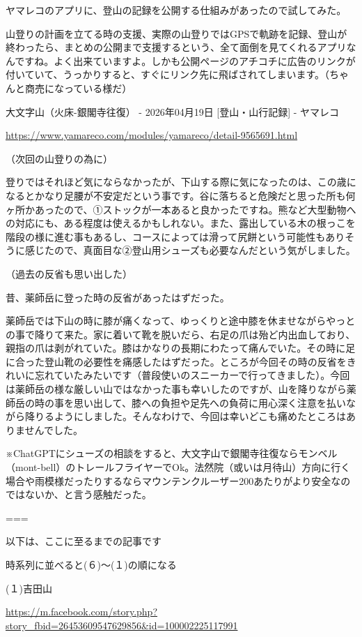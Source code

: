 ヤマレコのアプリに、登山の記録を公開する仕組みがあったので試してみた。

山登りの計画を立てる時の支援、実際の山登りではGPSで軌跡を記録、登山が終わったら、まとめの公開まで支援するという、全て面倒を見てくれるアプリなんですね。よく出来ていますよ。しかも公開ページのアチコチに広告のリンクが付いていて、うっかりすると、すぐにリンク先に飛ばされてしまいます。（ちゃんと商売になっている様だ）

大文字山（火床-銀閣寺往復） - 2026年04月19日 [登山・山行記録] - ヤマレコ

\url{https://www.yamareco.com/modules/yamareco/detail-9565691.html}

（次回の山登りの為に）

登りではそれほど気にならなかったが、下山する際に気になったのは、この歳になるとかなり足腰が不安定だという事です。谷に落ちると危険だと思った所も何ヶ所かあったので、①ストックが一本あると良かったですね。熊など大型動物への対応にも、ある程度は使えるかもしれない。また、露出している木の根っこを階段の様に進む事もあるし、コースによっては滑って尻餅という可能性もありそうに感じたので、真面目な②登山用シューズも必要なんだという気がしました。

（過去の反省も思い出した）

昔、薬師岳に登った時の反省があったはずだった。

薬師岳では下山の時に膝が痛くなって、ゆっくりと途中膝を休ませながらやっとの事で降りて来た。家に着いて靴を脱いだら、右足の爪は殆ど内出血しており、親指の爪は剥がれていた。膝はかなりの長期にわたって痛んでいた。その時に足に合った登山靴の必要性を痛感したはずだった。ところが今回その時の反省をきれいに忘れていたみたいです（普段使いのスニーカーで行ってきました）。今回は薬師岳の様な厳しい山ではなかった事も幸いしたのですが、山を降りながら薬師岳の時の事を思い出して、膝への負担や足先への負荷に用心深く注意を払いながら降りるようにしました。そんなわけで、今回は幸いどこも痛めたところはありませんでした。

※ChatGPTにシューズの相談をすると、大文字山で銀閣寺往復ならモンベル（mont-bell）のトレールフライヤーでOk。法然院（或いは月待山）方向に行く場合や雨模様だったりするならマウンテンクルーザー200あたりがより安全なのではないか、と言う感触だった。

===

以下は、ここに至るまでの記事です

時系列に並べると(６)〜(１)の順になる

(１)吉田山

\url{https://m.facebook.com/story.php?story_fbid=26453609547629856&id=100002225117991}

